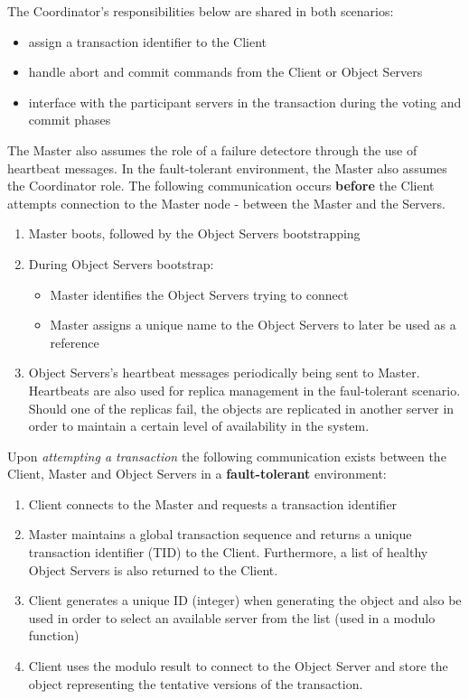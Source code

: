 \documentclass[times, 10pt,twocolumn]{article}
\begin{document}
The Coordinator's responsibilities below are shared in both scenarios:
\begin{itemize}[noitemsep,nolistsep]
\item assign a transaction identifier to the Client 
\item handle abort and commit commands from the Client or Object Servers 
\item interface with the participant servers in the transaction during the voting and commit phases 
\end{itemize}

The Master also assumes the role of a failure detectore through the use of heartbeat messages. In the fault-tolerant environment, the Master also assumes the Coordinator role.
\label{sec:algor}
The following communication occurs {\bf before} the Client attempts connection to the Master node - between the Master and the Servers.

\begin{enumerate}
\item Master boots, followed by the Object Servers bootstrapping
\item During Object Servers bootstrap:
\begin{itemize}[noitemsep, nolistsep]
\item Master identifies the Object Servers trying to connect
\item Master assigns a unique name to the Object Servers to later be used as a reference
\end{itemize}
\item Object Servers's heartbeat messages periodically being sent to Master. Heartbeats are also used for replica management in the faul-tolerant scenario. Should one of the replicas fail, the objects are replicated in another server in order to maintain a certain level of availability in the system.
\end{enumerate}

Upon {\it attempting a transaction} the following communication exists between the Client, Master and Object Servers in a {\bf fault-tolerant} environment: 
\begin{enumerate}
\item Client connects to the Master and requests a transaction identifier 
\item Master maintains a global transaction sequence and returns a unique transaction identifier (TID) to the Client. Furthermore, a list of healthy Object Servers is also returned to the Client. 
\item Client generates a unique ID (integer) when generating the object and also be used in order to select an available server from the list (used in a modulo function)
\item Client uses the modulo result to connect to the Object Server and store the object representing the tentative versions of the transaction.
\end{enumerate}
\end{document}

